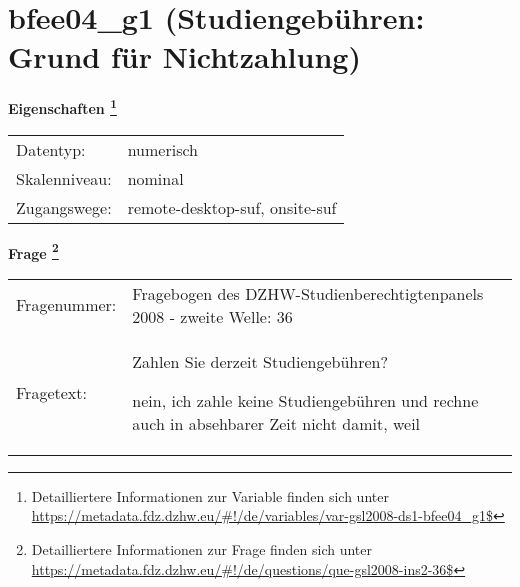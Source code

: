 
    \setcounter{footnote}{0}

    \vspace*{-1.8cm}
	\section{bfee04\_g1 (Studiengebühren: Grund für Nichtzahlung)}
	\label{section:bfee04_g1}



    \vspace*{0.5cm}
    \noindent\textbf{Eigenschaften
	\footnote{Detailliertere Informationen zur Variable finden sich unter
		\url{https://metadata.fdz.dzhw.eu/\#!/de/variables/var-gsl2008-ds1-bfee04_g1$}}}\\
	\begin{tabularx}{\hsize}{@{}lX}
	Datentyp: & numerisch \\
	Skalenniveau: & nominal \\
	Zugangswege: &
	  remote-desktop-suf, 
	  onsite-suf
 \\
    \end{tabularx}



				\vspace*{0.5cm}
                \noindent\textbf{Frage
	                \footnote{Detailliertere Informationen zur Frage finden sich unter
		              \url{https://metadata.fdz.dzhw.eu/\#!/de/questions/que-gsl2008-ins2-36$}}}\\
				\begin{tabularx}{\hsize}{@{}lX}
					Fragenummer: &
					  Fragebogen des DZHW-Studienberechtigtenpanels 2008 - zweite Welle:
					  36
 \\
					Fragetext: & Zahlen Sie derzeit Studiengebühren?\par  nein, ich zahle keine Studiengebühren und rechne auch in absehbarer Zeit nicht damit, weil \\
				\end{tabularx}





